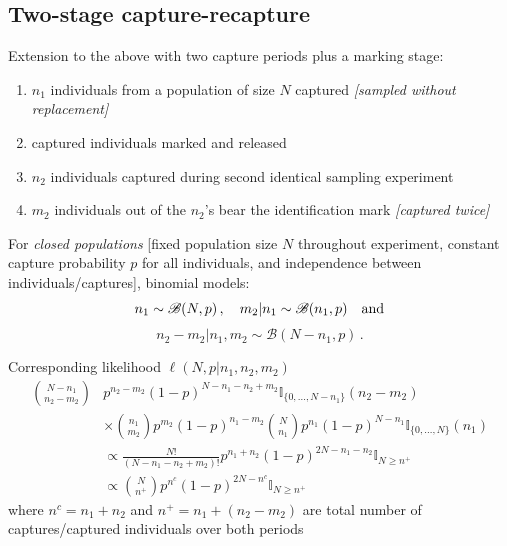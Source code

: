 \subsection{Two-stage capture-recapture}\begin{slide}

Extension to the above with two capture periods plus a marking stage:
\begin{enumerate}
\item  $n_1$ individuals from a population of size $N$ captured {\em [sampled without replacement]}
\item  captured individuals marked and released
\item  $n_2$ individuals captured during second identical sampling experiment
\item  $m_2$ individuals out of the $n_2$'s bear the identification mark {\em [captured twice]}
\end{enumerate}

\end{slide}\begin{slide}

For {\em closed populations} [fixed population size $N$ throughout
experiment, constant capture probability $p$ for all individuals, and independence between
individuals/captures], binomial models:
\pause
$$
n_1     \sim\mathscr{B}(N,p)\,,\quad
m_2|n_1 \sim\mathscr{B}(n_1,p)\quad\hbox{and}
$$
$$
n_2-m_2|n_1,m_2 \sim\mathscr{B}(N-n_1,p)\,.
$$

\end{slide}\begin{slide}

Corresponding likelihood $\ell(N,p|n_1,n_2,m_2)$
\small\begin{align*}
{N-n_1 \choose n_2-m_2} &p^{n_2-m_2}(1-p)^{N-n_1-n_2+m_2} \mathbb{I}_{\{0,\ldots,N-n_1\}}(n_2-m_2)\\
                      &\times  {n_1 \choose m_2}p^{m_2}(1-p)^{n_1-m_2}{N \choose n_1}p^{n_1}(1-p)^{N-n_1} \mathbb{I}_{\{0,\ldots,N\}}(n_1) \\
                      &\propto \frac{N!}{(N-n_1-n_2+m_2)!} p^{n_1+n_2}(1-p)^{2N-n_1-n_2}\mathbb{I}_{N\geq n^+} \\
                      &\propto {N \choose n^+}p^{n^c}(1-p)^{2N-n^c}\mathbb{I}_{N\geq n^+}
\end{align*}
\normalsize where $n^c=n_1+n_2$ and $n^+=n_1+(n_2-m_2)$ are
total number of captures/captured individuals over both periods 


\end{slide}
